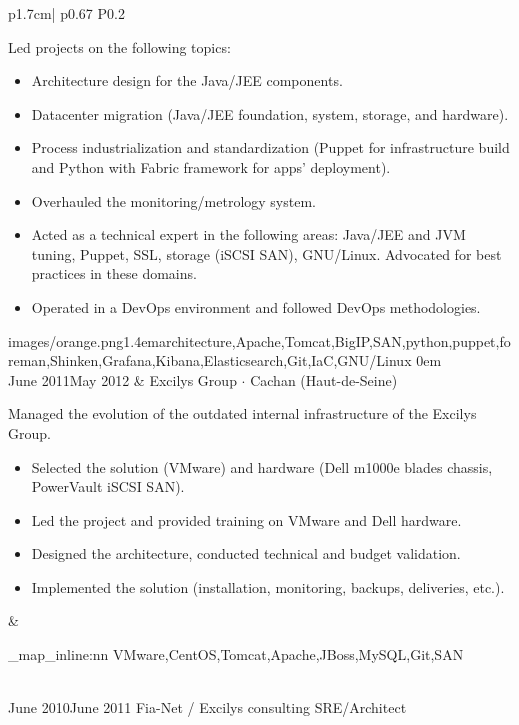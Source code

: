 \documentclass[darkhipster]{hipstercv}
\newcommand{\cvtags}[1] {
    \clist_map_inline:nn { #1 }
    {
        \cvtag{##1} %
    }
}
\newcommand{\cveventdetailed}[9]{
    {\small #1} &
    {#2 $\cdot$ \small{{#4 ~\faMapMarker}}}\vspace{.5em}\newline
    {\color{black!70}\footnotesize #5\vspace{#9}} &
    {\raisebox{-0.7\height}{\texttt{[image: \#6]}}} \vspace{#7}
    {\par \small \cvtags{#8}}
}
\begin{document}
\begin{longtable}{p{1.7cm}| p{} P{0.2\textwidth}}
{            Led projects on the following topics:
            \begin{itemize}
                \item Architecture design for the Java/JEE components.
                \item Datacenter migration (Java/JEE foundation, system, storage, and hardware).
                \item Process industrialization and standardization (Puppet for infrastructure build and Python with Fabric framework for apps' deployment).
                \item Overhauled the monitoring/metrology system.
                \item Acted as a technical expert in the following areas: Java/JEE and JVM tuning, Puppet, SSL, storage (iSCSI SAN), GNU/Linux. Advocated for best practices in these domains.
                \item Operated in a DevOps environment and followed DevOps methodologies.
            \end{itemize}
        }
        {images/orange.png}{1.4em}{architecture,Apache,Tomcat,BigIP,SAN,python,puppet,foreman,Shinken,Grafana,Kibana,Elasticsearch,Git,IaC,GNU/Linux}
        {0em} \\
    \cveventdetailed
        {June 2011\newline May 2012}
        {Excilys Group}
        {SRE/Architect}
        {Cachan (Haut-de-Seine)\color{cvred}}
        {
            Managed the evolution of the outdated internal infrastructure of the Excilys Group.
            \begin{itemize}
                \item Selected the solution (VMware) and hardware (Dell m1000e blades chassis, PowerVault iSCSI SAN).
                \item Led the project and provided training on VMware and Dell hardware.
                \item Designed the architecture, conducted technical and budget validation.
                \item Implemented the solution (installation, monitoring, backups, deliveries, etc.).
            \end{itemize}
        }
        {images/excilys.png}{0.3em}{VMware,CentOS,Tomcat,Apache,JBoss,MySQL,Git,SAN}
        {1.5em} \\
    \cveventdetailed
        {June 2010\newline June 2011}
        {Fia-Net / Excilys consulting}
        {SRE/Architect}

\end{longtable}
\end{document}

